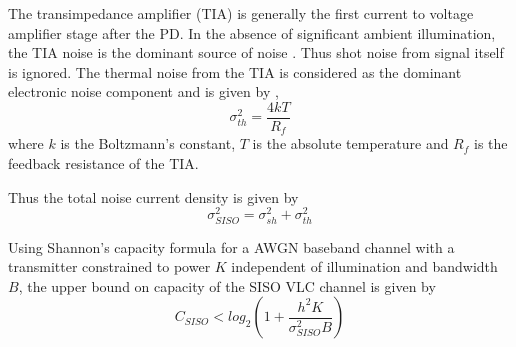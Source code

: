 The transimpedance amplifier (TIA) is generally the first current to voltage amplifier stage after the PD. In the absence of significant ambient illumination, the TIA noise is the dominant source of noise \cite{kah97a}. Thus shot noise from signal itself is ignored. The thermal noise from the TIA is considered as the dominant electronic noise component and is given by \cite{kah97a},
\begin{equation}
	\label{eqNpa}
	\sigma_{th}^{2} = \frac{4kT}{R_{f}}
\end{equation}
where $k$ is the Boltzmann's constant, $T$ is the absolute temperature and $R_{f}$ is the feedback resistance of the TIA.

Thus the total noise current density is given by
\begin{equation}
	\label{eqNoise}
	\sigma_{SISO}^{2} = \sigma_{sh}^{2} + \sigma_{th}^{2}
\end{equation}


Using Shannon's capacity formula for a AWGN baseband channel with a transmitter constrained to power $K$ independent of illumination and bandwidth $B$, the upper bound on capacity of the SISO VLC channel is given by \cite{sha48a}
\begin{equation}
	\label{eqSisoCap}
	C_{SISO} < log_{2}\left(1 + \frac{h^{2}K}{\sigma_{SISO}^{2}B}\right)
\end{equation}

